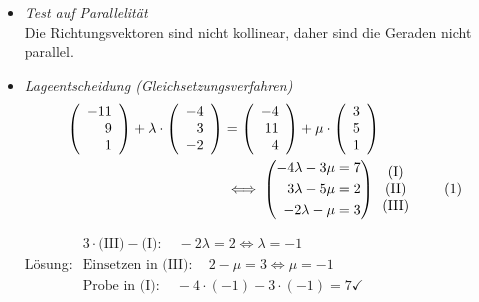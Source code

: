 \documentclass{ajc}
\numberwithin{equation}{subsection}
\newcommand\numberthis{\addtocounter{equation}{1}\tag{\theequation}}
\begin{document}
	\begin{itemize}
		\item \textit{Test auf Parallelität} \\ 
		Die Richtungsvektoren sind nicht kollinear, daher sind die Geraden nicht parallel.
		
		\item \textit{Lageentscheidung (Gleichsetzungsverfahren)} \\
		\begin{alignat*}{2}
			\left(\begin{array}{r} -11 \\ 9 \\ 1\end{array}\right) + \lambda \cdot \left(\begin{array}{r} -4 \\ 3 \\ -2\end{array}\right) &= \left(\begin{array}{r} -4 \\ 11 \\ 4\end{array}\right) + \mu \cdot \left(\begin{array}{r} 3 \\ 5 \\ 1\end{array}\right) \\
			&\iff \left(\begin{aligned} -4 \lambda - 3 \mu &= 7 \\ 3 \lambda - 5 \mu &= 2 \\ -2 \lambda  - \mu &= 3 \end{aligned}\right) \begin{array}{c} \text{(I)} \\ \text{(II)} \\ \text{(III)}\end{array} \numberthis
		\end{alignat*}
		
		Lösung: $\begin{array}{l}
			3\cdot\text{(III)} - \text{(I)}: \quad -2\lambda = 2 \Leftrightarrow \lambda = -1 \\ \text{Einsetzen in (III)}: \quad 2 - \mu = 3 \Leftrightarrow \mu = -1 \\ \text{Probe in  (I)}: \quad -4\cdot(-1) -3\cdot(-1) = 7 \checkmark \end{array}$
			

\end{itemize}
\end{document}
